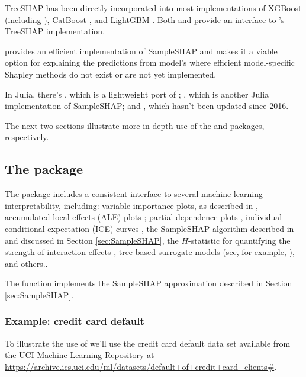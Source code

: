 TreeSHAP has been directly incorporated into most implementations of
XGBoost \citep{chen-2016-xgboost} (including 
\citep{R-xgboost}), CatBoost \citep{eronika-2017-catboost}, and LightGBM
\citep{ke-2017-lightgbm}. Both  \citep{R-fastshap} and
 \citep{R-SHAPforxgboost} provide an interface
to 's TreeSHAP implementation.

 provides an efficient implementation of SampleSHAP
and makes it a viable option for explaining the predictions from model's
where efficient model-specific Shapley methods do not exist or are not
yet implemented.

In Julia, there's , which is a lightweight port of
; , which is another Julia implementation
of SampleSHAP; and , which hasn't been updated
since 2016.

The next two sections illustrate more in-depth use of the  and
 packages, respectively.

\subsection{The  package}

The  package includes a consistent interface to several machine
learning interpretability, including: variable importance plots, as
described in \citet{fisher-2019-models}, accumulated local effects (ALE)
plots \citep{apley-2019-ale}; partial dependence plots
\citep{friedman-2001-greedy}, individual conditional expectation (ICE)
curves \citep{goldstein-peeking-2015}, the SampleSHAP algorithm
described in \citet{strumbelj-2014-explaining} and discussed in Section
\ref{sec:SampleSHAP}, the \(H\)-statistic for quantifying the strength
of interaction effects \citep{friedman-2008-predictive}, tree-based
surrogate models (see, for example, \citet[Chap. 5]{molnar-2019-iml}),
and others..

The  function implements the SampleSHAP
approximation described in Section \ref{sec:SampleSHAP}.

\subsubsection{Example: credit card default}

To illustrate the use of  we'll use the credit card
default data set \citep{cheng-2009-credit} available from the UCI
Machine Learning Repository at
\url{https://archive.ics.uci.edu/ml/datasets/default+of+credit+card+clients#}.

